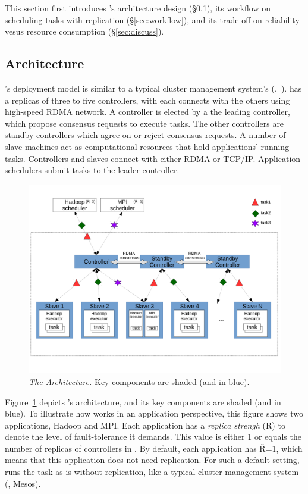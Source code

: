 This section first introduces \xxx's architecture design (\S\ref{sec:arch}), 
its workflow on scheduling tasks with replication (\S\ref{sec:workflow}), and 
its trade-off on reliability vesus resource consumption (\S\ref{sec:discuss}).


\subsection{Architecture} \label{sec:arch}

\xxx's deployment model is similar to a typical cluster management system's 
(\eg,~\cite{borg,mesos}). \xxx has a replicas of three to five controllers, 
with each connects with the others using high-speed RDMA network. A controller 
is elected by \paxos a the leading controller, which propose consensus requests 
to execute tasks. The other controllers are standby controllers which agree on 
or reject consensus requests. A number of slave machines act as computational 
resources that hold applications' running tasks. Controllers and slaves connect 
with either RDMA or TCP/IP. Application schedulers submit tasks to the leader 
controller.

\begin{figure}[t]
\vspace{.20in}
\centering
\includegraphics[width=.47\textwidth]{figures/arch}
\vspace{.06in}
\caption{{\em The \xxx Architecture.} Key components are shaded (and 
in blue).} \label{fig:arch}
\vspace{-.05in}
\end{figure}

Figure~\ref{fig:arch} depicts \xxx's architecture, and its key components are 
shaded (and in blue). To illustrate how \xxx works in an application 
perspective, this figure shows two applications, Hadoop and MPI. Each 
application has a \emph{replica strengh} (R) to denote the level of 
fault-tolerance it demands. This value is either 1 or equals the number of 
replicas of controllers in \xxx. By default, each application has \v{R=1}, 
which means that this application does not need replication. For such a default 
setting, \xxx runs the task as is without replication, like a typical cluster 
management system (\eg, Mesos).


